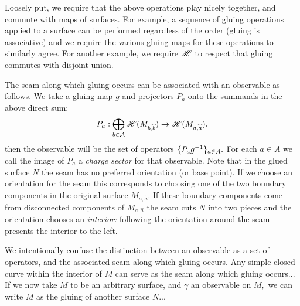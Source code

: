 \documentclass[aps, prl, letterpaper, twocolumn, superscriptaddress, notitlepage, 10pt]{revtex4-1}
\begin{document}
Loosely put, we require that the above operations play nicely together,
and commute with maps of surfaces.
For example,
a sequence of gluing operations 
applied to a surface can
be performed regardless of the order (gluing is associative)
and we require the various gluing maps for these operations to similarly agree.
For another example, we require $\mathscr{H}$ to respect that gluing
commutes with disjoint union.

The seam along which gluing occurs can be associated
with an observable as follows.
We take a gluing map $g$ and projectors $P_a$ onto the
summands in the above direct sum:
$$
    P_a: \bigoplus_{b\in\mathcal{A}} \mathscr{H}(M_{b,\widehat{b}}) \to \mathscr{H}(M_{a,\widehat{a}}).
$$
then the observable will be the set of operators 
$\{P_a g^{-1}\}_{a\in\mathcal{A}}.$
For each $a\in A$
we call the image of $P_a$ 
a \emph{charge sector} for that observable.
Note that in the glued surface $N$ the seam has no
preferred orientation (or base point).
If we choose an orientation 
for the seam this corresponds to choosing one of the
two boundary components in the original surface $M_{a,\widehat{a}}.$
If these boundary components come from disconnected components of 
$M_{a,\widehat{a}}$ the seam cuts $N$ into two pieces and the
orientation chooses an \emph{interior:}
following the orientation around the seam presents
the interior to the left.

We intentionally confuse the distinction between an
observable as a set of operators,
and the associated seam along which gluing occurs.
Any simple closed curve within the interior of $M$
can serve as the seam along which gluing occurs...
If we now take $M$ to be an arbitrary surface, and $\gamma$ an
observable on $M,$
we can write $M$ as the gluing of another surface $N$...
\end{document}
